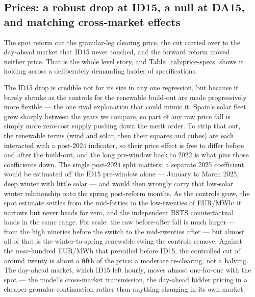 \documentclass[11pt,a4paper]{article}
\theoremstyle{definition}
\theoremstyle{remark}
\theoremstyle{plain}
\begin{document}
\subsection{Prices: a robust drop at ID15, a null at DA15, and matching cross-market effects}\label{sec:results:6-3}\label{sec:results:Q1}
\label{sec:results:6-2}
\label{sec:results:6-4}
\label{tab:specB-id15}
\label{tab:specB-da15}
\label{fig:bsts-id15}
\label{fig:bsts-da15}

The spot reform cut the granular-leg clearing price, the cut carried over to the day-ahead market that ID15 never touched, and the forward reform moved neither price. That is the whole level story, and Table~\ref{tab:price-specs} shows it holding across a deliberately demanding ladder of specifications.

The ID15 drop is credible not for its size in any one regression, but because it barely shrinks as the controls for the renewable build-out are made progressively more flexible --- the one rival explanation that could mimic it. Spain's solar fleet grew sharply between the years we compare, so part of any raw price fall is simply more zero-cost supply pushing down the merit order. To strip that out, the renewable terms (wind and solar, then their squares and cubes) are each interacted with a post-2024 indicator, so their price effect is free to differ before and after the build-out, and the long pre-window back to 2022 is what pins those coefficients down. The single post-2024 split matters: a separate 2025 coefficient would be estimated off the ID15 pre-window alone --- January to March 2025, deep winter with little solar --- and would then wrongly carry that low-solar winter relationship onto the spring post-reform months. As the controls grow, the spot estimate settles from the mid-forties to the low-twenties of EUR/MWh: it narrows but never heads for zero, and the independent BSTS counterfactual lands in the same range. For scale: the raw before-after fall is much larger --- from the high nineties before the switch to the mid-twenties after --- but almost all of that is the winter-to-spring renewable swing the controls remove. Against the near-hundred EUR/MWh that prevailed before ID15, the controlled cut of around twenty is about a fifth of the price: a moderate re-clearing, not a halving. The day-ahead market, which ID15 left hourly, moves almost one-for-one with the spot --- the model's cross-market transmission, the day-ahead bidder pricing in a cheaper granular continuation rather than anything changing in its own market.
\end{document}
